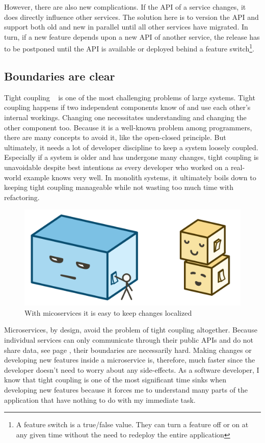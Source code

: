 However, there are also new complications. If the API of a service changes, it does directly influence other services. The solution here is to version the API and support both old and new in parallel until all other services have migrated. In turn, if a new feature depends upon a new API of another service, the release has to be postponed until the API is available or deployed behind a feature switch\footnote{A feature switch is a true/false value. They can turn a feature off or on at any given time without the need to redeploy the entire application}.


\subsection{Boundaries are clear}

Tight coupling ~\cite{kaye.2003} is one of the most challenging problems of large systems. Tight coupling happens if two independent components know of and use each other's internal workings. Changing one necessitates understanding and changing the other component too. Because it is a well-known problem among programmers, there are many concepts to avoid it, like the open-closed principle. But ultimately, it needs a lot of developer discipline to keep a system loosely coupled. Especially if a system is older and has undergone many changes, tight coupling is unavoidable despite best intentions as every developer who worked on a real-world example knows very well. In monolith systems, it ultimately boils down to keeping tight coupling manageable while not wasting too much time with refactoring.

\begin{figure}[ht]
  \centering
  \includegraphics[width=0.55\linewidth]{assets/illustration-setting.png}
  \caption{With micoservices it is easy to keep changes localized}
\end{figure}

Microservices, by design, avoid the problem of tight coupling altogether. Because individual services can only communicate through their public APIs and do not share data, see page \pageref{sec:theory:decentralized-data}, their boundaries are necessarily hard. Making changes or developing new features inside a microservice is, therefore, much faster since the developer doesn't need to worry about any side-effects. As a software developer, I know that tight coupling is one of the most significant time sinks when developing new features because it forces me to understand many parts of the application that have nothing to do with my immediate task.


